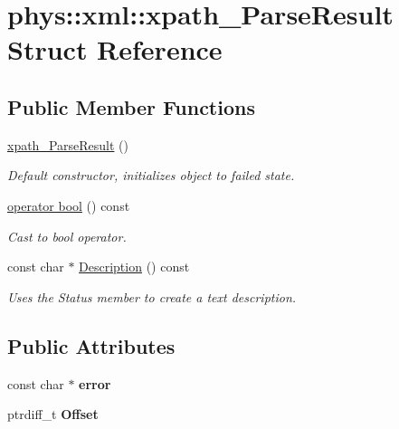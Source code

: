 \hypertarget{structphys_1_1xml_1_1xpath__ParseResult}{
\section{phys::xml::xpath\_\-ParseResult Struct Reference}
\label{d0/dea/structphys_1_1xml_1_1xpath__ParseResult}
}
\subsection*{Public Member Functions}
\begin{DoxyCompactItemize}
\item 
\hypertarget{structphys_1_1xml_1_1xpath__ParseResult_a2c46d3bf4eb6d2c8fed40de1a2473c81}{
\hyperlink{structphys_1_1xml_1_1xpath__ParseResult_a2c46d3bf4eb6d2c8fed40de1a2473c81}{xpath\_\-ParseResult} ()}
\label{d0/dea/structphys_1_1xml_1_1xpath__ParseResult_a2c46d3bf4eb6d2c8fed40de1a2473c81}

\begin{DoxyCompactList}\small\item\em Default constructor, initializes object to failed state. \item\end{DoxyCompactList}\item 
\hyperlink{structphys_1_1xml_1_1xpath__ParseResult_a210c6d852c5a25ab48a9d6cb14b5c264}{operator bool} () const 
\begin{DoxyCompactList}\small\item\em Cast to bool operator. \item\end{DoxyCompactList}\item 
const char $\ast$ \hyperlink{structphys_1_1xml_1_1xpath__ParseResult_ad3fedd375ed44cecdfe681b63f8f0424}{Description} () const 
\begin{DoxyCompactList}\small\item\em Uses the Status member to create a text description. \item\end{DoxyCompactList}\end{DoxyCompactItemize}
\subsection*{Public Attributes}
\begin{DoxyCompactItemize}
\item 
\hypertarget{structphys_1_1xml_1_1xpath__ParseResult_a4d13b5f1df482ec090db158045fa2cbf}{
const char $\ast$ {\bfseries error}}
\label{d0/dea/structphys_1_1xml_1_1xpath__ParseResult_a4d13b5f1df482ec090db158045fa2cbf}

\item 
\hypertarget{structphys_1_1xml_1_1xpath__ParseResult_a9284de559dd8ba295ec0d04bc7698538}{
ptrdiff\_\-t {\bfseries Offset}}
\label{d0/dea/structphys_1_1xml_1_1xpath__ParseResult_a9284de559dd8ba295ec0d04bc7698538}

\end{DoxyCompactItemize}


